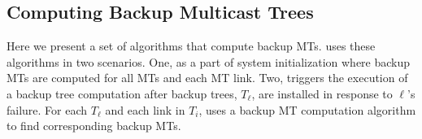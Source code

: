 



















\subsection{Computing Backup Multicast Trees}
\label{subsec:repair}


Here we present a set of algorithms that compute backup MTs.  \mdr uses these algorithms in two scenarios. One, as a part of system initialization where backup MTs are computed for all MTs and each MT link. %
Two, \mdr triggers the execution of a backup tree computation after backup trees, $T_{\ell}$, are installed in response to $\ell$'s failure. %
For each $T_{\ell}$ and each link in $T_i$, \mdr uses a backup MT computation algorithm to find corresponding backup MTs.

